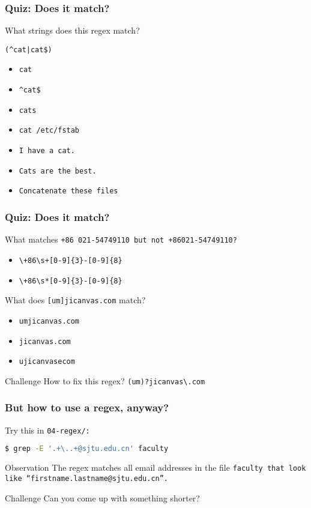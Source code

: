 \begin{frame}[fragile]
\frametitle{Quiz: Does it match?}
What strings does this regex match? \newline

\Large \verb!(^cat|cat$)! \normalsize

\begin{itemize}
    \item \verb|cat|                      %
    \item \verb|^cat$|                    %
    \item \verb|cats|                     %
    \item \verb|cat /etc/fstab|           %
    \item \verb|I have a cat.|            %
    \item \verb|Cats are the best.|       %
    \item \verb|Concatenate these files|  %
\end{itemize}
\end{frame}

\begin{frame}[fragile]
\frametitle{Quiz: Does it match?}
What matches \tt{+86 021-54749110} but not \tt{+86021-54749110}?
\begin{itemize}
    \item \verb|\+86\s+[0-9]{3}-[0-9]{8}|
    \item \verb|\+86\s*[0-9]{3}-[0-9]{8}| %
\end{itemize}

What does \Large \verb|[um]jicanvas.com| \normalsize match?
\begin{itemize}
    \item \tt{umjicanvas.com}
    \item \tt{jicanvas.com}
    \item \tt{ujicanvasecom} %
\end{itemize}

\begin{block}{Challenge}
    How to fix this regex? \pause \verb|(um)?jicanvas\.com|
\end{block}
\end{frame}

\begin{frame}[fragile]
\frametitle{But how to use a regex, anyway?}
Try this in \tt{04-regex/}:
\begin{lstlisting}[language=bash]
$ grep -E '.+\..+@sjtu.edu.cn' faculty
\end{lstlisting}
\pause
\begin{block}{Observation}
    The regex matches all email addresses in the file \tt{faculty}
    that look like ``firstname.lastname@sjtu.edu.cn''.
\end{block}
\begin{block}{Challenge}
    Can you come up with something shorter?
\end{block}
\end{frame}

